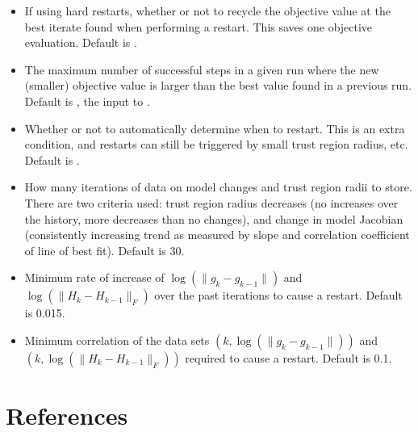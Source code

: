 \documentclass[letterpaper,10pt,english]{sphinxmanual}
\begin{document}
\begin{itemize}
\item {} 
 \sphinxhyphen{} If using hard restarts, whether or not to recycle the objective value at the best iterate found when performing a restart. This saves one objective evaluation. Default is .

\item {} 
 \sphinxhyphen{} The maximum number of successful steps in a given run where the new (smaller) objective value is larger than the best value found in a previous run. Default is , the input to .

\item {} 
 \sphinxhyphen{} Whether or not to automatically determine when to restart. This is an extra condition, and restarts can still be triggered by small trust region radius, etc. Default is .

\item {} 
 \sphinxhyphen{} How many iterations of data on model changes and trust region radii to store. There are two criteria used: trust region radius decreases (no increases over the history, more decreases than no changes), and change in model Jacobian (consistently increasing trend as measured by slope and correlation coefficient of line of best fit). Default is 30.

\item {} 
 \sphinxhyphen{} Minimum rate of increase of \(\log(\|g_k-g_{k-1}\|)\) and \(\log(\|H_k-H_{k-1}\|_F)\) over the past iterations to cause a restart. Default is 0.015.

\item {} 
 \sphinxhyphen{} Minimum correlation of the data sets \((k, \log(\|g_k-g_{k-1}\|))\) and \((k, \log(\|H_k-H_{k-1}\|_F))\) required to cause a restart. Default is 0.1.

\end{itemize}


\section{References}
\label{\detokenize{advanced:references}}
\end{document}

